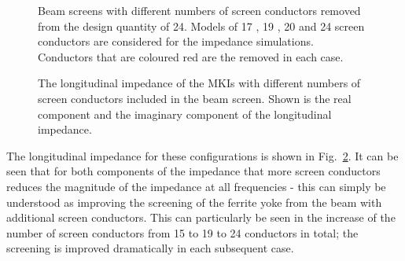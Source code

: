 \begin{figure}
{\label{fig:24-cond-alt}
}
\caption{Beam screens with different numbers of screen conductors removed from the design quantity of 24. Models of 17 , 19 , 20  and 24  screen conductors are considered for the impedance simulations. Conductors that are coloured red are the removed in each case.}
\label{fig:mki-take-away-cond-alt}
\end{figure}

\begin{figure}
\caption{The longitudinal impedance of the MKIs with different numbers of screen conductors included in the beam screen. Shown is the real component  and the imaginary component  of the longitudinal impedance.}
\label{fig:remove-cond-impedance}
\end{figure}

The longitudinal impedance for these configurations is shown in Fig.~\ref{fig:remove-cond-impedance}. It can be seen that for both components of the impedance that more screen conductors reduces the magnitude of the impedance at all frequencies - this can simply be understood as improving the screening of the ferrite yoke from the beam with additional screen conductors. This can particularly be seen in the increase of the number of screen conductors from 15 to 19 to 24 conductors in total; the screening is improved dramatically in each subsequent case. 

